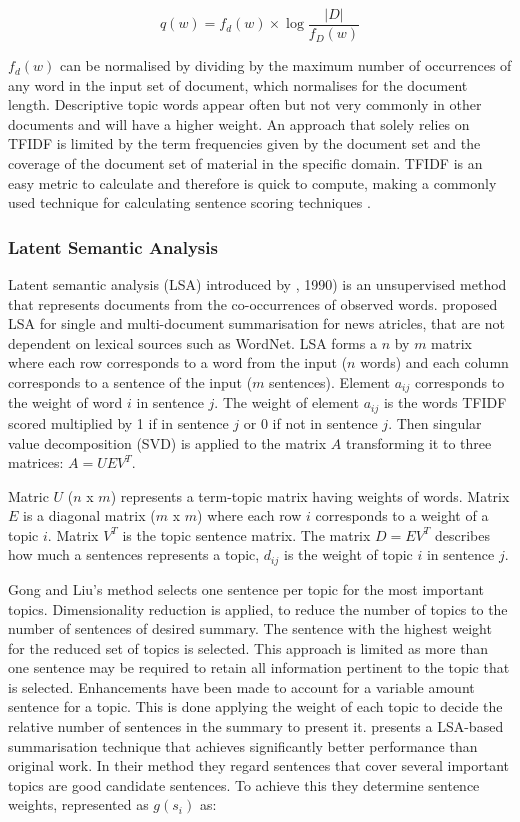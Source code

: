 \begin{equation}
      q(w) = f_d(w) \times \log\frac{|D|}{f_D(w)}
      \label{tfidf}
\end{equation}

$f_d(w)$ can be normalised by dividing by the maximum number of occurrences of any word in the input set of document, which normalises for the document length. Descriptive topic words appear often but not very commonly in other documents and will have a higher weight. An approach that solely relies on TFIDF is limited by the term frequencies given by the document set and the coverage of the document set of material in the specific domain. TFIDF is an easy metric to calculate and therefore is quick to compute, making a commonly used technique for calculating sentence scoring techniques \citep{gambhir2017recent}.

\subsubsection{Latent Semantic Analysis}
Latent semantic analysis (LSA) introduced by \citep{deerwester1990indexing}, 1990) is an unsupervised method that represents documents from the co-occurrences of observed words. \citet{gong2001generic} proposed LSA for single and multi-document summarisation for news atricles, that are not dependent on lexical sources such as WordNet. LSA forms a $n$ by $m$ matrix where each row corresponds to a word from the input ($n$ words) and each column corresponds to a sentence of the input ($m$ sentences). Element $a_{ij}$ corresponds to the weight of word $i$ in sentence $j$. The weight of element $a_{ij}$ is the words TFIDF scored multiplied by 1 if in sentence $j$ or 0 if not in sentence $j$. Then singular value decomposition (SVD) is applied to the matrix $A$ transforming it to three matrices: $A = UEV^T$.

Matric $U$ ($n$ x $m$) represents a term-topic matrix having weights of words. Matrix $E$ is a diagonal matrix ($m$ x $m$) where each row $i$ corresponds to a weight of a topic $i$. Matrix $V^T$ is the topic sentence matrix. The matrix $D = EV^T$ describes how much a sentences represents a topic, $d_{ij}$ is the weight of topic $i$ in sentence $j$.

Gong and Liu’s method selects one sentence per topic for the most important topics. Dimensionality reduction is applied, to reduce the number of topics to the number of sentences of desired summary. The sentence with the highest weight for the reduced set of topics is selected. This approach is limited as more than one sentence may be required to retain all information pertinent to the topic that is selected. Enhancements have been made to account for a variable amount sentence for a topic. This is done applying the weight of each topic to decide the relative number of sentences in the summary to present it. \citet{steinberger2007two} presents a LSA-based summarisation technique that achieves significantly better performance than original work. In their method they regard sentences that cover several important topics are good candidate sentences. To achieve this they determine sentence weights, represented as $g(s_i)$ as:

